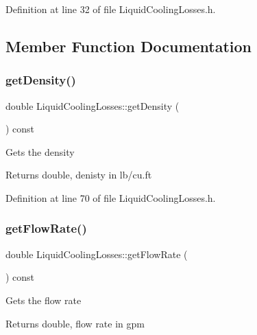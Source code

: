Definition at line 32 of file Liquid\+Cooling\+Losses.\+h.



\subsection{Member Function Documentation}
\mbox{\label{class_liquid_cooling_losses_ab2a34915eeba8bcea46d67a72cbe17d2}} 
\subsubsection{\texorpdfstring{get\+Density()}{getDensity()}}
{\footnotesize\ttfamily double Liquid\+Cooling\+Losses\+::get\+Density (\begin{DoxyParamCaption}{ }\end{DoxyParamCaption}) const\hspace{0.3cm}{\ttfamily [inline]}}

Gets the density \begin{DoxyReturn}{Returns}
double, denisty in lb/cu.\+ft 
\end{DoxyReturn}


Definition at line 70 of file Liquid\+Cooling\+Losses.\+h.

\mbox{\label{class_liquid_cooling_losses_acb4a68199bdc5f0597d1feadc3ecdb2c}} 
\subsubsection{\texorpdfstring{get\+Flow\+Rate()}{getFlowRate()}}
{\footnotesize\ttfamily double Liquid\+Cooling\+Losses\+::get\+Flow\+Rate (\begin{DoxyParamCaption}{ }\end{DoxyParamCaption}) const\hspace{0.3cm}{\ttfamily [inline]}}

Gets the flow rate \begin{DoxyReturn}{Returns}
double, flow rate in gpm 
\end{DoxyReturn}


